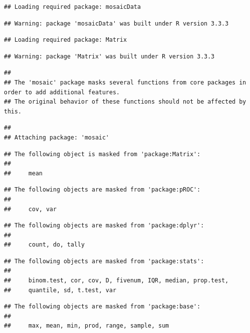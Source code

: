 \documentclass[]{article}
\begin{document}
\begin{verbatim}
## Loading required package: mosaicData
\end{verbatim}

\begin{verbatim}
## Warning: package 'mosaicData' was built under R version 3.3.3
\end{verbatim}

\begin{verbatim}
## Loading required package: Matrix
\end{verbatim}

\begin{verbatim}
## Warning: package 'Matrix' was built under R version 3.3.3
\end{verbatim}

\begin{verbatim}
## 
## The 'mosaic' package masks several functions from core packages in order to add additional features.  
## The original behavior of these functions should not be affected by this.
\end{verbatim}

\begin{verbatim}
## 
## Attaching package: 'mosaic'
\end{verbatim}

\begin{verbatim}
## The following object is masked from 'package:Matrix':
## 
##     mean
\end{verbatim}

\begin{verbatim}
## The following objects are masked from 'package:pROC':
## 
##     cov, var
\end{verbatim}

\begin{verbatim}
## The following objects are masked from 'package:dplyr':
## 
##     count, do, tally
\end{verbatim}

\begin{verbatim}
## The following objects are masked from 'package:stats':
## 
##     binom.test, cor, cov, D, fivenum, IQR, median, prop.test,
##     quantile, sd, t.test, var
\end{verbatim}

\begin{verbatim}
## The following objects are masked from 'package:base':
## 
##     max, mean, min, prod, range, sample, sum
\end{verbatim}
\end{document}
